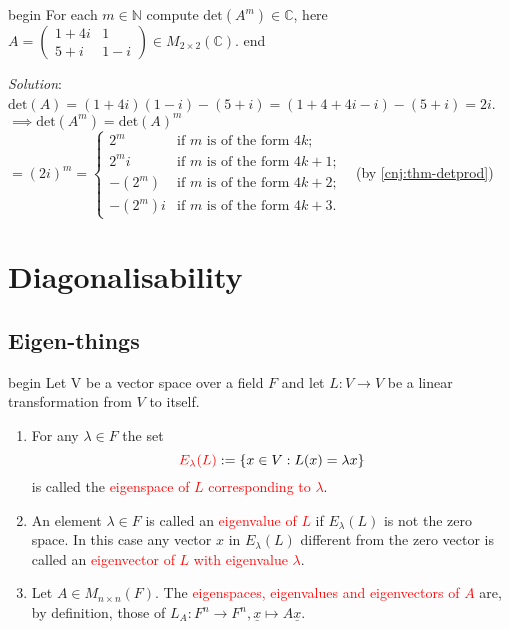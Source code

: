 \documentclass[
  12pt,
  a4paper,
  twoside]{article}
\theoremstyle{plain}
\theoremstyle{definition}
\begin{document}
\csname begin\label{cnj:expl-detprod}
For each \(m \in \mathbb{N}\) compute \(\mathrm{det}(A^{m}) \in \mathbb{C}\),
here \(A = \begin{pmatrix} 1 + 4i & 1 \\ 5 + i & 1 - i \end{pmatrix} \in M_{2 \times 2}(\mathbb{C})\).
\csname end

\emph{Solution}: \(\mathrm{det}(A) = (1+4i)(1-i) - (5+i) = (1+4+4i-i) - (5+i) = 2i\).\\
\(\implies \mathrm{det}(A^{m}) = \mathrm{det}(A)^{m}\) \(= (2i)^{m} = \begin{cases} 2^{m} & \text{if } m \text{ is of the form } 4k; \\ 2^{m}i & \text{if } m \text{ is of the form } 4k+1; \\ -(2^{m}) & \text{if } m \text{ is of the form } 4k+2; \\ -(2^{m})i & \text{if } m \text{ is of the form } 4k+3. \end{cases}\)
\hfill~{(by \ref{cnj:thm-detprod})}

\newpage

\hypertarget{diag}{%
\section{Diagonalisability}\label{diag}}

\hypertarget{ss-eigenthings}{%
\subsection{Eigen-things}\label{ss-eigenthings}}

\csname begin\label{cnj:defn-eigen}
Let V be a vector space over a field \(F\) and let \(L: V \to V\) be a linear transformation from \(V\) to itself.

\begin{enumerate}
\def\labelenumi{(\alph{enumi})}
\item
  For any \(\lambda \in F\) the set
  \[
  {\color{red}{E_{\lambda}(L)}} := \{ x \in V : L(x)= \lambda x \}
  \]
  is called the \textcolor{red}{eigenspace of $L$ corresponding to $\lambda$}.
\item
  An element \(\lambda \in F\) is called an \textcolor{red}{eigenvalue  of $L$} if \(E_{\lambda}(L)\) is not the zero space. In this case any vector \(x\) in \(E_{\lambda}(L)\) different from the zero vector is called an \textcolor{red}{eigenvector of $L$ with eigenvalue $\lambda$}.
\item
  Let \(A \in M_{n \times n}(F)\). The \textcolor{red}{eigenspaces, eigenvalues and eigenvectors of $A$} are, by definition, those of \(L_{A} : F^{n} \to F^{n}, \underline{x} \mapsto A \underline{x}\).
\end{enumerate}
\end{document}
